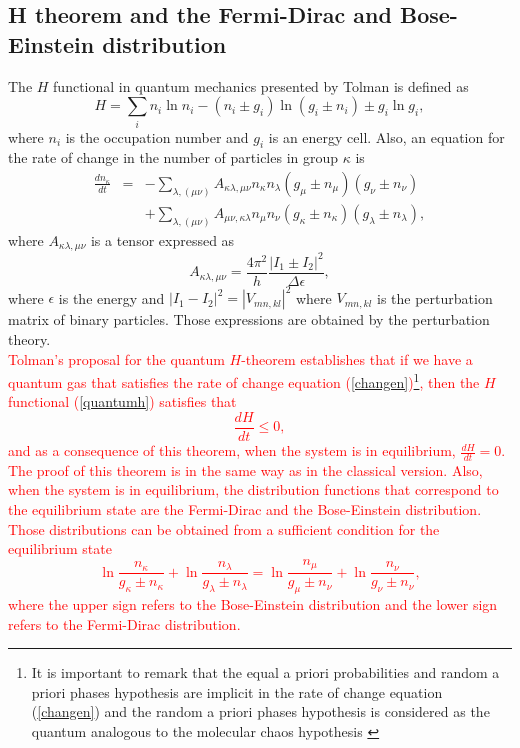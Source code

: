 \documentclass{article}
\begin{document}
\subsection{H theorem and the Fermi-Dirac and Bose-Einstein distribution}
The $H$ functional in quantum mechanics presented by Tolman \cite{tolman} is defined as 
\begin{equation}
    H=\sum_i n_i \ln n_i -(n_i\pm g_i)\ln (g_i \pm n_i)\pm g_i\ln g_i, \label{quantumh}
\end{equation}
where $n_i$ is the occupation number and $g_i$ is an energy cell. Also, an equation for the rate of change in the number of particles in group $\kappa$ is
\begin{eqnarray}
    \frac{d n_{\kappa}}{dt}&=&-\sum_{\lambda,(\mu \nu)}A_{\kappa\lambda,\mu\nu} n_{\kappa}n_{\lambda}(g_{\mu}\pm n_{\mu})(g_{\nu}\pm n_{\nu})\nonumber \\
    &&+\sum_{\lambda,(\mu \nu)}A_{\mu\nu,\kappa\lambda} n_{\mu}n_{\nu}(g_{\kappa}\pm n_{\kappa})(g_{\lambda}\pm n_{\lambda}),\label{changen}
\end{eqnarray}
where $A_{\kappa\lambda,\mu\nu}$ is a tensor expressed as
\begin{equation}
  A_{\kappa\lambda,\mu\nu}=\frac{4\pi^{2}}{h}\frac{|I_1\pm I_2|^2}{\Delta \epsilon},
\end{equation}
where $\epsilon$ is the energy and $|I_1-I_2|^2=|V_{mn,kl}|^2$ where $V_{mn,kl}$ is the perturbation matrix of binary particles. Those expressions are obtained by the perturbation theory.\\
\textcolor{red}{Tolman's proposal for the quantum $H$-theorem establishes that if we have a quantum gas that satisfies the rate of change equation (\ref{changen})\footnote{It is important to remark that the equal a priori probabilities and random a priori phases hypothesis are implicit in the rate of change equation (\ref{changen}) and the random a priori phases hypothesis is considered as the quantum analogous to the molecular chaos hypothesis \cite{binary}}, then the $H$ functional (\ref{quantumh}) satisfies that
\begin{equation}
    \frac{dH}{dt}\leq 0,
\end{equation}
and as a consequence of this theorem, when the system is in equilibrium, $\frac{dH}{dt}=0$.\\
The proof of this theorem is in the same way as in the classical version. Also, when the system is in equilibrium, the distribution functions that correspond to the equilibrium state are the Fermi-Dirac and the Bose-Einstein distribution. Those distributions can be obtained from a sufficient condition for the equilibrium state
\begin{equation}
    \ln \frac{n_{\kappa}}{g_{\kappa}\pm n_{\kappa}}+\ln \frac{n_{\lambda}}{g_{\lambda}\pm n_{\lambda}}=\ln \frac{n_{\mu}}{g_{\mu}\pm n_{\nu}}+\ln \frac{n_{\nu}}{g_{\nu}\pm n_{\nu}},
\end{equation}
where the upper sign refers to the Bose-Einstein distribution and the lower sign refers to the Fermi-Dirac distribution.}\\
\end{document}
